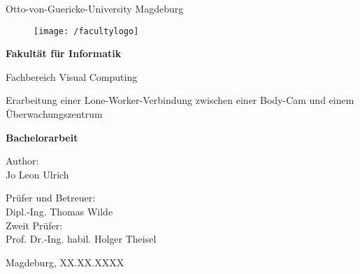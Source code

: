 \documentclass[thesis.tex]{subfiles}
\begin{document}
\thispagestyle {empty}

\begin{center}
\begin{Large}
Otto-von-Guericke-University Magdeburg\\

\begin{figure}
	\centering
	\texttt{[image: /facultylogo]}
	\label{fig:logoinffak}
\end{figure}

\vspace{3mm}

\textbf{Fakultät für Informatik}\\
\end{Large}

\vspace{3mm}

Fachbereich Visual Computing\\

\vspace{1cm}
\begin{Huge}
Erarbeitung einer Lone-Worker-Verbindung zwischen einer Body-Cam und einem Überwachungszentrum\\
\end{Huge}
\vspace{15mm}
{\Huge \textbf{Bachelorarbeit}}\\
\vspace{15mm}

Author:\\
\vspace{4mm}
{\huge Jo Leon Ulrich}\\

\vspace{16mm}

Prüfer und Betreuer:\\
\vspace{2mm}
{\Large Dipl.-Ing. Thomas Wilde}\\
\vspace{4mm}
Zweit Prüfer:\\
\vspace{2mm}
{\Large Prof. Dr.-Ing. habil. Holger Theisel}\\
\vspace{10mm}


\vspace{25mm}

{\large Magdeburg, XX.XX.XXXX}\\

\vspace{40mm}

\end{center}
\clearpage
\end{document}
